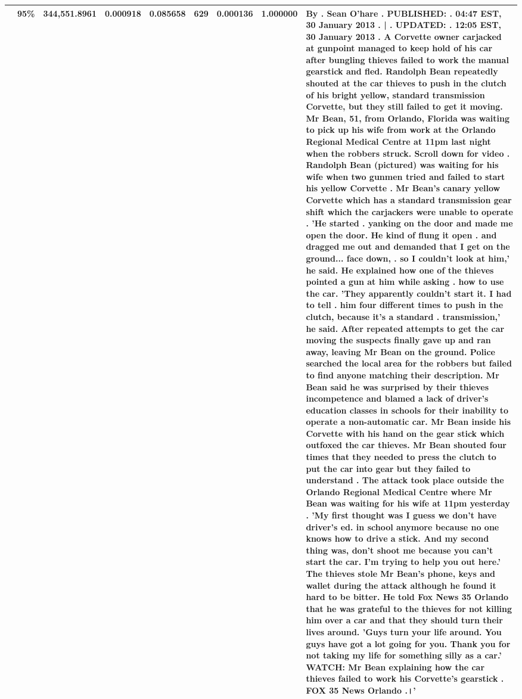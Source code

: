 \begin{table}[H]
\begin{tabular}{llrrrrrrl}
 & 95\% & 344,551.8961 & 0.000918 & 0.085658 & \color{red} 629 & 0.000136 & \bfseries \color{red} 1.000000 & By . Sean O'hare . PUBLISHED: . 04:47 EST, 30 January 2013 . | . UPDATED: . 12:05 EST, 30 January 2013 . A Corvette owner carjacked at gunpoint managed to keep hold of his car after bungling thieves failed to work the manual gearstick and fled. Randolph Bean repeatedly shouted at the car thieves to push in the clutch of his bright yellow, standard transmission Corvette, but they still failed to get it moving. Mr Bean, 51, from Orlando, Florida was waiting to pick up his wife from work at the Orlando Regional Medical Centre at 11pm last night when the robbers struck. Scroll down for video . Randolph Bean (pictured) was waiting for his wife when two gunmen tried and failed to start his yellow Corvette . Mr Bean's canary yellow Corvette which has a standard transmission gear shift which the carjackers were unable to operate . 'He started . yanking on the door and made me open the door. He kind of flung it open . and dragged me out and demanded that I get on the ground... face down, . so I couldn't look at him,' he said. He explained how one of the thieves pointed a gun at him while asking . how to use the car. 'They apparently couldn't start it. I had to tell . him four different times to push in the clutch, because it's a standard . transmission,' he said. After repeated attempts to get the car moving the suspects finally gave up and ran away, leaving Mr Bean on the ground. Police searched the local area for the robbers but failed to find anyone matching their description. Mr Bean said he was surprised by their thieves incompetence and blamed a lack of driver's education classes in schools for their inability to operate a non-automatic car. Mr Bean inside his Corvette with his hand on the gear stick which outfoxed the car thieves. Mr Bean shouted four times that they needed to press the clutch to put the car into gear but they failed to understand . The attack took place outside the Orlando Regional Medical Centre where Mr Bean was waiting for his wife at 11pm yesterday . 'My first thought was I guess we don't have driver's ed. in school anymore because no one knows how to drive a stick. And my second thing was, don't shoot me because you can't start the car. I'm trying to help you out here.' The thieves stole Mr Bean's phone, keys and wallet during the attack although he found it hard to be bitter. He told Fox News 35 Orlando that he was grateful to the thieves for not killing him over a car and that they should turn their lives around. 'Guys turn your life around. You guys have got a lot going for you. Thank you for not taking my life for something silly as a car.' WATCH: Mr Bean explaining how the car thieves failed to work his Corvette's gearstick . FOX 35 News Orlando .।' \\
\bottomrule
\end{tabular}
\end{table}
